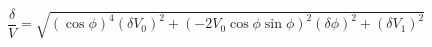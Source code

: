 \begin{equation}
\label{eq:delta_V_Malus}
\frac\delta V = \sqrt{ \left(\cos{\phi}\right)^4(\delta V_0)^2 + \left(-2 V_0 \cos{\phi}\sin{\phi} \right)^2(\delta \phi)^2+ (\delta V_1)^2}
\end{equation}